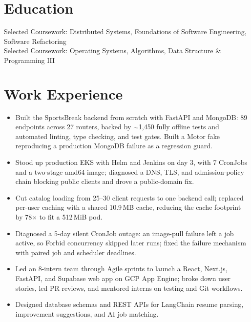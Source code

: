 \documentclass[11pt, letterpaper]{article}
\begin{document}

\section{Education}
Selected Coursework: Distributed Systems, Foundations of Software Engineering, Software Refactoring\\[1pt]
Selected Coursework: Operating Systems, Algorithms, Data Structure \& Programming III

\section{Work Experience}
\begin{itemize}
  \item Built the SportsBreak backend from scratch with FastAPI and MongoDB: 89 endpoints across 27 routers, backed by $\sim$1{,}450 fully offline tests and automated linting, type checking, and test gates. Built a Motor fake reproducing a production MongoDB failure as a regression guard.
  \item Stood up production EKS with Helm and Jenkins on day 3, with 7 CronJobs and a two-stage amd64 image; diagnosed a DNS, TLS, and admission-policy chain blocking public clients and drove a public-domain fix.
  \item Cut catalog loading from 25--30 client requests to one backend call; replaced per-user caching with a shared 10.9\,MB cache, reducing the cache footprint by 78$\times$ to fit a 512\,MiB pod.
  \item Diagnosed a 5-day silent CronJob outage: an image-pull failure left a job active, so Forbid concurrency skipped later runs; fixed the failure mechanism with paired job and scheduler deadlines.
\end{itemize}

\begin{itemize}
  \item Led an 8-intern team through Agile sprints to launch a React, Next.js, FastAPI, and Supabase web app on GCP App Engine; broke down user stories, led PR reviews, and mentored interns on testing and Git workflows.
  \item Designed database schemas and REST APIs for LangChain resume parsing, improvement suggestions, and AI job matching.
\end{itemize}
\end{document}
